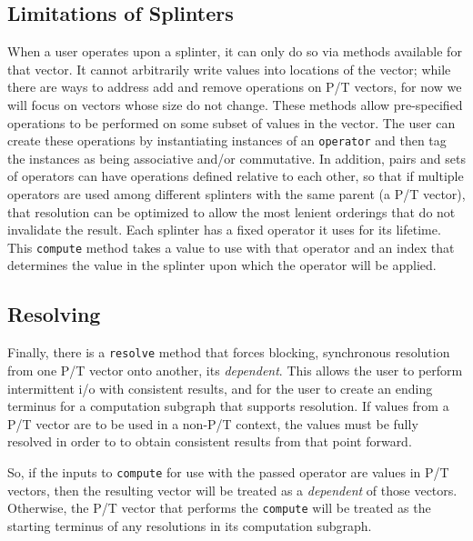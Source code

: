 \subsection{Limitations of Splinters}
When a user operates upon a splinter, it can only do so via methods
available for that vector. It cannot arbitrarily write values into locations of
the vector; while there are ways to address add and remove operations on P/T
vectors, for now we will focus on vectors whose size do not change.
These methods allow pre-specified operations to be performed on some subset of
values in the vector. The user can create these operations by instantiating
instances of an \texttt{operator} and then tag the instances as being associative and/or
commutative. In addition, pairs and sets of operators can have operations
defined relative to each other, so that if multiple operators are used among
different splinters with the same parent (a P/T vector), that resolution can
be optimized to allow the most lenient orderings that do not invalidate the
result. Each splinter has a fixed operator it uses for its lifetime. 
This \texttt{compute} method takes a value to use with that operator and an index that 
determines the value in the splinter upon which the operator will be applied.

\subsection{Resolving}
Finally, there is a \texttt{resolve} method that forces blocking, synchronous
resolution from one P/T vector onto another, its \textit{dependent}. 
This allows the user to perform intermittent i/o
with consistent results, and for the user to create an ending terminus for a
computation subgraph that supports resolution. If values from a P/T vector are
to be used in a non-P/T context, the values must be fully resolved in order to
to obtain consistent results from that point forward.

So, if the inputs to \texttt{compute} for use with the passed operator are values in 
P/T vectors, then the resulting vector will be treated as a \textit{dependent} of those 
vectors. Otherwise, the P/T vector that performs
the \texttt{compute} will be treated as the starting terminus of any resolutions in its 
computation subgraph.

